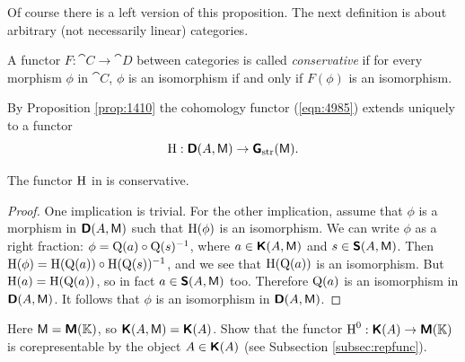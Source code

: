 Of course there is a left version of this proposition.
The next definition is about arbitrary (not necessarily linear) categories. 

\begin{dfn} \label{4980}
A functor $F : \cat{C} \to \cat{D}$ between categories is called  
{\em conservative} if for every morphism $\phi$ in $\cat{C}$, 
$\phi$ is an isomorphism if and only if $F(\phi)$ is an isomorphism. 
\end{dfn}

By Proposition \ref{prop:1410} the cohomology functor (\ref{eqn:4985}) extends 
uniquely to a functor 
\begin{equation} \label{eqn:4986}
\operatorname{H} : \boldsymbol{\mathsf{D}}(A, \operatorname{\mathsf{M}}) \to \boldsymbol{\mathsf{G}}_{\mathrm{str}}(\operatorname{\mathsf{M}}) . 
\end{equation}

\begin{cor} \label{cor:2145}
The functor $\operatorname{H}$ in \tup{(\ref{eqn:4986})} is conservative.
\end{cor}

\begin{proof}
One implication is trivial. For the other implication, assume that 
$\phi$ is a morphism in $\boldsymbol{\mathsf{D}}(A, \operatorname{\mathsf{M}})$ such that 
$\operatorname{H}(\phi)$ is an isomorphism. We can write $\phi$ as a right fraction: 
$\phi = \operatorname{Q}(a) \circ \operatorname{Q}(s)^{-1}$, 
where $a \in \boldsymbol{\mathsf{K}}(A, \operatorname{\mathsf{M}})$ and 
$s \in \boldsymbol{\mathsf{S}}(A, \operatorname{\mathsf{M}})$.
Then 
$\operatorname{H}(\phi) = \operatorname{H}(\operatorname{Q}(a)) \circ \operatorname{H}(\operatorname{Q}(s))^{-1}$,
and we see that $\operatorname{H}(\operatorname{Q}(a))$ is an isomorphism.
But $\operatorname{H}(a) = \operatorname{H}(\operatorname{Q}(a))$, so in fact 
$a \in \boldsymbol{\mathsf{S}}(A, \operatorname{\mathsf{M}})$ too. Therefore 
$\operatorname{Q}(a)$ is an isomorphism in 
$\boldsymbol{\mathsf{D}}(A, \operatorname{\mathsf{M}})$. It follows that $\phi$ is an isomorphism in 
$\boldsymbol{\mathsf{D}}(A, \operatorname{\mathsf{M}})$.
\end{proof}

\begin{exer} \label{exer:1846}
Here $\operatorname{\mathsf{M}} = \boldsymbol{\mathsf{M}}(\mathbb{K})$, so 
$\boldsymbol{\mathsf{K}}(A, \operatorname{\mathsf{M}}) = \boldsymbol{\mathsf{K}}(A)$. Show that the functor 
$\operatorname{H}^0 : \boldsymbol{\mathsf{K}}(A) \to \boldsymbol{\mathsf{M}}(\mathbb{K})$ is corepresentable 
by the object $A \in \boldsymbol{\mathsf{K}}(A)$ (see Subsection 
\ref{subsec:repfunc}). 
\end{exer}

